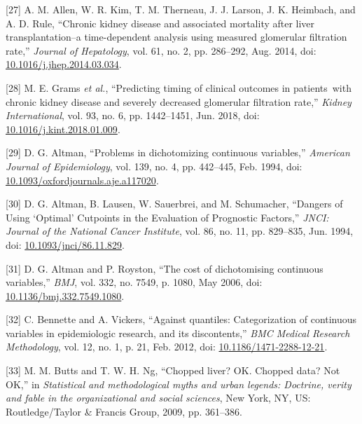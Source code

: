 \documentclass[
]{article}
\newenvironment{cslreferences}%
  {}%
  {\par}
\begin{document}
\begin{cslreferences}
\leavevmode\hypertarget{ref-allen_chronic_2014}{}%
{[}27{]} A. M. Allen, W. R. Kim, T. M. Therneau, J. J. Larson, J. K. Heimbach, and A. D. Rule, ``Chronic kidney disease and associated mortality after liver transplantation--a time-dependent analysis using measured glomerular filtration rate,'' \emph{Journal of Hepatology}, vol. 61, no. 2, pp. 286--292, Aug. 2014, doi: \href{https://doi.org/10.1016/j.jhep.2014.03.034}{10.1016/j.jhep.2014.03.034}.

\leavevmode\hypertarget{ref-grams_predicting_2018}{}%
{[}28{]} M. E. Grams \emph{et al.}, ``Predicting timing of clinical outcomes in patients~with chronic kidney disease and severely decreased glomerular filtration rate,'' \emph{Kidney International}, vol. 93, no. 6, pp. 1442--1451, Jun. 2018, doi: \href{https://doi.org/10.1016/j.kint.2018.01.009}{10.1016/j.kint.2018.01.009}.

\leavevmode\hypertarget{ref-altman_problems_1994-1}{}%
{[}29{]} D. G. Altman, ``Problems in dichotomizing continuous variables,'' \emph{American Journal of Epidemiology}, vol. 139, no. 4, pp. 442--445, Feb. 1994, doi: \href{https://doi.org/10.1093/oxfordjournals.aje.a117020}{10.1093/oxfordjournals.aje.a117020}.

\leavevmode\hypertarget{ref-altman_dangers_1994-1}{}%
{[}30{]} D. G. Altman, B. Lausen, W. Sauerbrei, and M. Schumacher, ``Dangers of Using `Optimal' Cutpoints in the Evaluation of Prognostic Factors,'' \emph{JNCI: Journal of the National Cancer Institute}, vol. 86, no. 11, pp. 829--835, Jun. 1994, doi: \href{https://doi.org/10.1093/jnci/86.11.829}{10.1093/jnci/86.11.829}.

\leavevmode\hypertarget{ref-altman_cost_2006-1}{}%
{[}31{]} D. G. Altman and P. Royston, ``The cost of dichotomising continuous variables,'' \emph{BMJ}, vol. 332, no. 7549, p. 1080, May 2006, doi: \href{https://doi.org/10.1136/bmj.332.7549.1080}{10.1136/bmj.332.7549.1080}.

\leavevmode\hypertarget{ref-bennette_against_2012-1}{}%
{[}32{]} C. Bennette and A. Vickers, ``Against quantiles: Categorization of continuous variables in epidemiologic research, and its discontents,'' \emph{BMC Medical Research Methodology}, vol. 12, no. 1, p. 21, Feb. 2012, doi: \href{https://doi.org/10.1186/1471-2288-12-21}{10.1186/1471-2288-12-21}.

\leavevmode\hypertarget{ref-butts_chopped_2009-1}{}%
{[}33{]} M. M. Butts and T. W. H. Ng, ``Chopped liver? OK. Chopped data? Not OK,'' in \emph{Statistical and methodological myths and urban legends: Doctrine, verity and fable in the organizational and social sciences}, New York, NY, US: Routledge/Taylor \& Francis Group, 2009, pp. 361--386.


\end{cslreferences}
\end{document}
